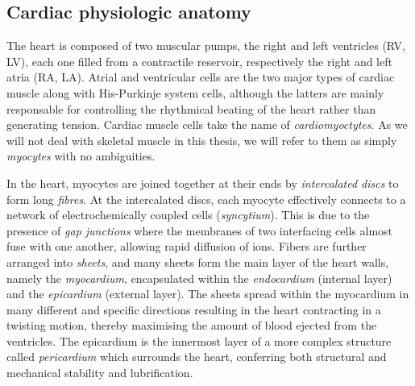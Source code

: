 


%
%
%
\subsection{Cardiac physiologic anatomy}\label{sec:ch1cardiac_physiologic_anatomy}
The heart is composed of two muscular pumps, the right and left ventricles (\acs{RV}, \acs{LV}), each one filled from a contractile reservoir, respectively the right and left atria (\acs{RA}, \acs{LA}). Atrial and ventricular cells are the two major types of cardiac muscle along with His-Purkinje system cells, although the latters are mainly responsable for controlling the rhythmical beating of the heart rather than generating tension. Cardiac muscle cells take the name of \textit{cardiomyoctytes}. As we will not deal with skeletal muscle in this thesis, we will refer to them as simply \textit{myocytes} with no ambiguities.

\vspace{0.2cm}
In the heart, myocytes are joined together at their ends by \textit{intercalated discs} to form long \textit{fibres}. At the intercalated discs, each myocyte effectively connects to a network of electrochemically coupled cells (\textit{syncytium}). This is due to the presence of \textit{gap junctions} where the membranes of two interfacing cells almost fuse with one another, allowing rapid diffusion of ions. Fibers are further arranged into \textit{sheets}, and many sheets form the main layer of the heart walls, namely the \textit{myocardium}, encapsulated within the \textit{endocardium} (internal layer) and the \textit{epicardium} (external layer). The sheets spread within the myocardium in many different and specific directions resulting in the heart contracting in a twisting motion, thereby maximising the amount of blood ejected from the ventricles. The epicardium is the innermost layer of a more complex structure called \textit{pericardium} which surrounds the heart, conferring both structural and mechanical stability and lubrification.

